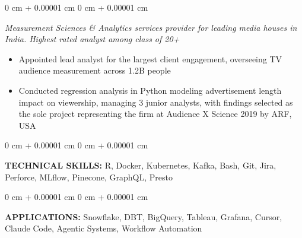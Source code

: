 \documentclass[10pt, letterpaper]{article}
\newenvironment{highlights}{
    \begin{itemize}[
        topsep=0.10 cm,
        parsep=0.10 cm,
        partopsep=0pt,
        itemsep=0pt,
        leftmargin=0 cm + 10pt
    ]
}{
    \end{itemize}
} %
\newenvironment{onecolentry}{
    \begin{adjustwidth}{
        0 cm + 0.00001 cm
    }{
        0 cm + 0.00001 cm
    }
}{
    \end{adjustwidth}
} %
\begin{document}
\begin{onecolentry}
    \textit{Measurement Sciences \& Analytics services provider for leading media houses in India. Highest rated analyst among class of 20+}
     \begin{highlights}
                \item Appointed lead analyst for the largest client engagement, overseeing TV audience measurement across 1.2B people
     \end{highlights}
     
    
                \item %
     
     \begin{highlights}
        \item Conducted regression analysis in Python modeling advertisement length impact on viewership, managing 3 junior analysts, with findings selected as the sole project representing the firm at Audience X Science 2019 by ARF, USA
   \end{highlights}
\end{onecolentry}




        \vspace{0.2 cm}

\begin{onecolentry}
    \textbf{TECHNICAL SKILLS:} R, Docker, Kubernetes, Kafka, Bash, Git, Jira, Perforce, MLflow, Pinecone, GraphQL, Presto
\end{onecolentry}
\vspace{0.2 cm}
\begin{onecolentry}
    \textbf{APPLICATIONS:} Snowflake, DBT, BigQuery, Tableau, Grafana, Cursor, Claude Code, Agentic Systems, Workflow Automation
\end{onecolentry}
    
\end{document}

